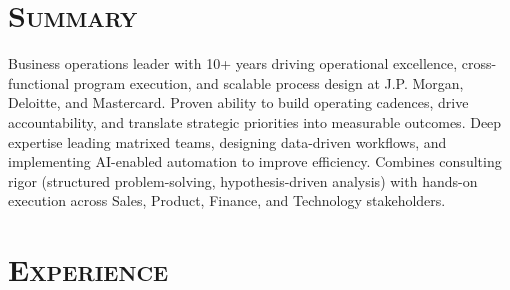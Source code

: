\documentclass[11pt,a4paper]{moderncv}
\begin{document}
\makecvtitle
\vspace{-40pt}

\section{\textsc{Summary}}
\vspace{-7pt}
Business operations leader with 10+ years driving operational excellence, cross-functional program execution, and scalable process design at J.P. Morgan, Deloitte, and Mastercard. Proven ability to build operating cadences, drive accountability, and translate strategic priorities into measurable outcomes. Deep expertise leading matrixed teams, designing data-driven workflows, and implementing AI-enabled automation to improve efficiency. Combines consulting rigor (structured problem-solving, hypothesis-driven analysis) with hands-on execution across Sales, Product, Finance, and Technology stakeholders.

\section{\textsc{Experience}}
\end{document}
